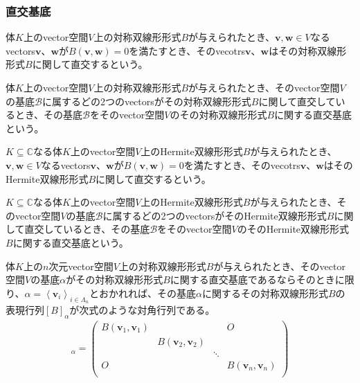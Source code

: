\documentclass[dvipdfmx]{jsarticle}
\begin{document}
\subsubsection{直交基底}%
\begin{dfn}
体$K$上のvector空間$V$上の対称双線形形式$B$が与えられたとき、$\mathbf{v},\mathbf{w} \in V$なるvectors$\mathbf{v}$、$\mathbf{w}$が$B\left( \mathbf{v},\mathbf{w} \right) = 0$を満たすとき、そのvecotrs$\mathbf{v}$、$\mathbf{w}$はその対称双線形形式$B$に関して直交するという。
\end{dfn}
\begin{dfn}
体$K$上のvector空間$V$上の対称双線形形式$B$が与えられたとき、そのvector空間$V$の基底$\mathcal{B}$に属するどの2つのvectorsがその対称双線形形式$B$に関して直交しているとき、その基底$\mathcal{B}$をそのvector空間$V$のその対称双線形形式$B$に関する直交基底という。
\end{dfn}
\begin{dfn}
$K \subseteq \mathbb{C}$なる体$K$上のvector空間$V$上のHermite双線形形式$B$が与えられたとき、$\mathbf{v},\mathbf{w} \in V$なるvectors$\mathbf{v}$、$\mathbf{w}$が$B\left( \mathbf{v},\mathbf{w} \right) = 0$を満たすとき、そのvecotrs$\mathbf{v}$、$\mathbf{w}$はそのHermite双線形形式$B$に関して直交するという。
\end{dfn}
\begin{dfn}
$K \subseteq \mathbb{C}$なる体$K$上のvector空間$V$上のHermite双線形形式$B$が与えられたとき、そのvector空間$V$の基底$\mathcal{B}$に属するどの2つのvectorsがそのHermite双線形形式$B$に関して直交しているとき、その基底$\mathcal{B}$をそのvector空間$V$のそのHermite双線形形式$B$に関する直交基底という。
\end{dfn}
\begin{thm}\label{2.3.5.9}
体$K$上の$n$次元vector空間$V$上の対称双線形形式$B$が与えられたとき、そのvector空間$V$の基底$\alpha$がその対称双線形形式$B$に関する直交基底であるならそのときに限り、$\alpha = \left\langle \mathbf{v}_{i} \right\rangle_{i \in \varLambda_{n}}$とおかれれば、その基底$\alpha$に関するその対称双線形形式$B$の表現行列$[ B]_{\alpha}$が次式のような対角行列である。
\begin{align*}
[ B]_{\alpha} = \begin{pmatrix}
B\left( \mathbf{v}_{1},\mathbf{v}_{1} \right) & \  & \  & O \\
\  & B\left( \mathbf{v}_{2},\mathbf{v}_{2} \right) & \  & \  \\
\  & \  & \ddots & \  \\
O & \  & \  & B\left( \mathbf{v}_{n},\mathbf{v}_{n} \right) \\
\end{pmatrix}
\end{align*}
\end{thm}
\end{document}
